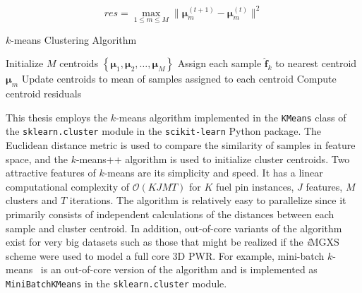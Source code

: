 \begin{equation}
\label{eqn:chap10-kmeans-residuals}
res = \max_{1 \le m \le M} \|\boldsymbol{\mu}_{m}^{(t+1)} - \boldsymbol{\mu}_{m}^{(t)}\|^{2}
\end{equation}

\begin{algorithm}[ht!]
\caption[$k$-means Clustering Algorithm]{$k$-means Clustering Algorithm}
\label{alg:chap10-kmeans}
\begin{algorithmic}[1]
  \State Initialize $M$ centroids $\left\{ \boldsymbol{\mu}_{1}, \boldsymbol{\mu}_{2}, \dots, \boldsymbol{\mu}_{M} \right\}$
    \State Assign each sample $\boldsymbol{\hat{f}}_{k}$ to nearest centroid $\boldsymbol{\mu}_{m}$ 
    \State Update centroids to mean of samples assigned to each centroid 
    \State Compute centroid residuals 
  \EndWhile
\end{algorithmic}
\end{algorithm}

This thesis employs the $k$-means algorithm implemented in the \texttt{KMeans} class of the \texttt{sklearn.cluster} module in the \texttt{scikit-learn} Python package. The Euclidean distance metric is used to compare the similarity of samples in feature space, and the $k$-means++ algorithm is used to initialize cluster centroids. Two attractive features of $k$-means are its simplicity and speed. It has a linear computational complexity of $\mathcal{O}(KJMT)$ for $K$ fuel pin instances, $J$ features, $M$ clusters and $T$ iterations. The algorithm is relatively easy to parallelize since it primarily consists of independent calculations of the distances between each sample and cluster centroid. In addition, out-of-core variants of the algorithm exist for very big datasets such as those that might be realized if the \textit{i}\ac{MGXS} scheme were used to model a full core 3D \ac{PWR}. For example, mini-batch $k$-means~\cite{sculley2010minibatchkmeans} is an out-of-core version of the algorithm and is implemented as \texttt{MiniBatchKMeans} in the \texttt{sklearn.cluster} module.

